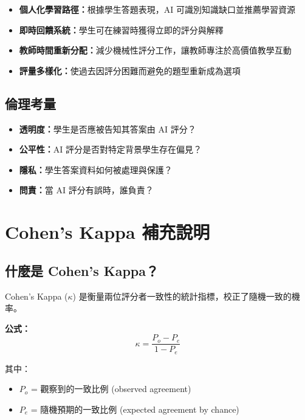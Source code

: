 \documentclass[12pt,a4paper]{article}
\begin{document}
\begin{itemize}[leftmargin=2em]
    \item \textbf{個人化學習路徑：}根據學生答題表現，AI 可識別知識缺口並推薦學習資源
    \item \textbf{即時回饋系統：}學生可在練習時獲得立即的評分與解釋
    \item \textbf{教師時間重新分配：}減少機械性評分工作，讓教師專注於高價值教學互動
    \item \textbf{評量多樣化：}使過去因評分困難而避免的題型重新成為選項
\end{itemize}

\subsection{倫理考量}

\begin{itemize}[leftmargin=2em]
    \item \textbf{透明度：}學生是否應被告知其答案由 AI 評分？
    \item \textbf{公平性：}AI 評分是否對特定背景學生存在偏見？
    \item \textbf{隱私：}學生答案資料如何被處理與保護？
    \item \textbf{問責：}當 AI 評分有誤時，誰負責？
\end{itemize}

\section{Cohen's Kappa 補充說明}

\subsection{什麼是 Cohen's Kappa？}

Cohen's Kappa ($\kappa$) 是衡量兩位評分者一致性的統計指標，校正了隨機一致的機率。

\textbf{公式：}
$$\kappa = \frac{P_o - P_e}{1 - P_e}$$

其中：
\begin{itemize}[leftmargin=2em]
    \item $P_o$ = 觀察到的一致比例 (observed agreement)
    \item $P_e$ = 隨機預期的一致比例 (expected agreement by chance)
\end{itemize}
\end{document}
